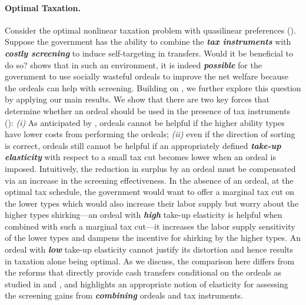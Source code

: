 \documentclass[12pt,letterpaper]{article}
\newenvironment{original}{\color{black}\noindent}{}
\theoremstyle{plain}
\theoremstyle{definition}
\theoremstyle{remark}
\renewcommand{\1}{\mathds{1}}
\theoremstyle{definition}
\begin{document}
\paragraph{Optimal Taxation.}\hspace{-2mm}\begin{original}Consider the optimal nonlinear taxation problem with quasilinear preferences (\citealt{diamond1998optimal}). Suppose the government has the ability to combine the \textit{\textbf{tax instruments}} with \textit{\textbf{costly screening}} to induce self-targeting in transfers. Would it be beneficial to do so?
\citet{Nichols1982b} shows that in such an environment, it is indeed \textit{\textbf{possible}} for the government to use socially wasteful ordeals to improve the net welfare because the ordeals can help with screening. Building on \citet{Nichols1982b}, we further explore this question by applying our main results. We show that there are two key forces that determine whether an ordeal should be used in the presence of tax instruments (): \textit{(i)} As anticipated by \citet{Nichols1982b}, ordeals cannot be helpful if the higher ability types have lower costs from performing the ordeals; \textit{(ii)} even if the direction of sorting is correct, ordeals still cannot be helpful if an appropriately defined \textit{\textbf{take-up elasticity}} with respect to a small tax cut becomes lower when an ordeal is imposed. Intuitively, the reduction in surplus by an ordeal must be compensated via an increase in the screening effectiveness. In the absence of an ordeal, at the optimal tax schedule, the government would want to offer a marginal tax cut on the lower types which would also increase their labor supply but worry about the higher types shirking---an ordeal with \textit{\textbf{high}} take-up elasticity is helpful when combined with such a marginal tax cut---it increases the labor supply sensitivity of the lower types and dampens the incentive for shirking by the higher types. An ordeal with \textit{\textbf{low}} take-up elasticity cannot justify its distortion and hence results in taxation alone being optimal. As we discuss, the comparison here differs from the reforms that directly provide cash transfers conditional on the ordeals as studied in \citet*{yang2023comparison} and \citet*{rafkin2023self}, and highlights an appropriate notion of elasticity for assessing the screening gains from \textit{\textbf{combining}} ordeals and tax instruments.
\end{original}
\end{document}
